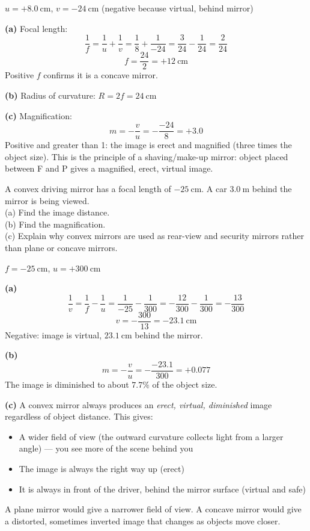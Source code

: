 \begin{solutionbox}
$u = +8.0\ \text{cm}$, $v = -24\ \text{cm}$
(negative because virtual, behind mirror)

\textbf{(a)} Focal length:
\[
  \frac{1}{f} = \frac{1}{u} + \frac{1}{v}
  = \frac{1}{8} + \frac{1}{-24}
  = \frac{3}{24} - \frac{1}{24} = \frac{2}{24}
\]
\[
  f = \frac{24}{2} = +12\ \text{cm}
\]
Positive $f$ confirms it is a concave mirror.

\textbf{(b)} Radius of curvature:
$R = 2f = 24\ \text{cm}$

\textbf{(c)} Magnification:
\[
  m = -\frac{v}{u} = -\frac{-24}{8} = +3.0
\]
Positive and greater than 1: the image is erect
and magnified (three times the object size).
This is the principle of a shaving/make-up mirror:
object placed between F and P gives a magnified,
erect, virtual image.
\end{solutionbox}

\begin{examplebox}[19.3]
A convex driving mirror has a focal length of
$-25\ \text{cm}$. A car $3.0\ \text{m}$ behind
the mirror is being viewed.\\
(a) Find the image distance.\\
(b) Find the magnification.\\
(c) Explain why convex mirrors are used as rear-view
and security mirrors rather than plane or concave mirrors.
\end{examplebox}

\begin{solutionbox}
$f = -25\ \text{cm}$, $u = +300\ \text{cm}$

\textbf{(a)}
\[
  \frac{1}{v} = \frac{1}{f} - \frac{1}{u}
  = \frac{1}{-25} - \frac{1}{300}
  = -\frac{12}{300} - \frac{1}{300}
  = -\frac{13}{300}
\]
\[
  v = -\frac{300}{13} = -23.1\ \text{cm}
\]
Negative: image is virtual, $23.1\ \text{cm}$
behind the mirror.

\textbf{(b)}
\[
  m = -\frac{v}{u} = -\frac{-23.1}{300}
  = +0.077
\]
The image is diminished to about $7.7\%$ of the
object size.

\textbf{(c)} A convex mirror always produces an
\textit{erect, virtual, diminished} image regardless
of object distance. This gives:
\begin{itemize}[noitemsep]
  \item A wider field of view (the outward curvature
  collects light from a larger angle) --- you see more
  of the scene behind you
  \item The image is always the right way up (erect)
  \item It is always in front of the driver, behind
  the mirror surface (virtual and safe)
\end{itemize}
A plane mirror would give a narrower field of view.
A concave mirror would give a distorted, sometimes
inverted image that changes as objects move closer.
\end{solutionbox}

